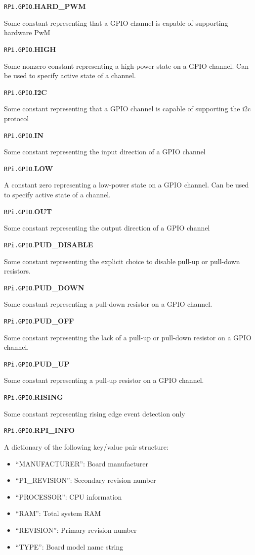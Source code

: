 \documentclass[12pt]{article}
\begin{document}
\noindent \texttt{RPi.GPIO}.\textbf{HARD\_PWM}

Some constant representing that a GPIO channel is capable of supporting hardware PwM

\noindent \texttt{RPi.GPIO}.\textbf{HIGH}

Some nonzero constant representing a high-power state on a GPIO channel.
Can be used to specify active state of a channel.


\noindent \texttt{RPi.GPIO}.\textbf{I2C}

Some constant representing that a GPIO channel is capable of supporting the i2c protocol

\noindent \texttt{RPi.GPIO}.\textbf{IN}

Some constant representing the input direction of a GPIO channel

\noindent \texttt{RPi.GPIO}.\textbf{LOW}

A constant zero representing a low-power state on a GPIO channel.
Can be used to specify active state of a channel.

\noindent \texttt{RPi.GPIO}.\textbf{OUT}

Some constant representing the output direction of a GPIO channel

\noindent \texttt{RPi.GPIO}.\textbf{PUD\_DISABLE}

Some constant representing the explicit choice to disable pull-up or pull-down resistors.

\noindent \texttt{RPi.GPIO}.\textbf{PUD\_DOWN}

Some constant representing a pull-down resistor on a GPIO channel.

\noindent \texttt{RPi.GPIO}.\textbf{PUD\_OFF}

Some constant representing the lack of a pull-up or pull-down resistor on a GPIO channel.

\noindent \texttt{RPi.GPIO}.\textbf{PUD\_UP}

Some constant representing a pull-up resistor on a GPIO channel.

\noindent \texttt{RPi.GPIO}.\textbf{RISING}

Some constant representing rising edge event detection only


\noindent \texttt{RPi.GPIO}.\textbf{RPI\_INFO}

A dictionary of the following key/value pair structure:
\begin{itemize}
    \item ``MANUFACTURER'': Board manufacturer
    \item ``P1\_REVISION'': Secondary revision number
    \item ``PROCESSOR'': CPU information
    \item ``RAM'': Total system RAM
    \item ``REVISION'': Primary revision number
    \item ``TYPE'': Board model name string
\end{itemize}
\end{document}
